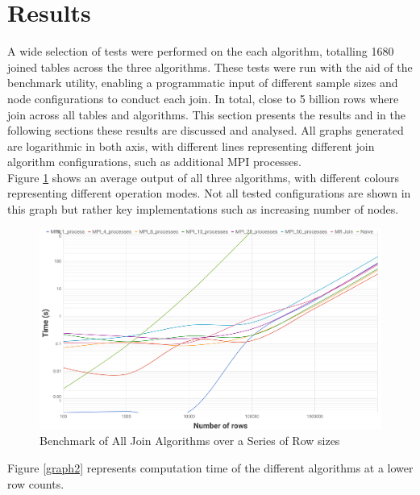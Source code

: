 \documentclass[10.5 pt, conference]{IEEEtran}
\begin{document}
\section{Results}
A wide selection of tests were performed on the each algorithm, totalling 1680 joined tables across the three algorithms. These tests were run with the aid of the benchmark utility, enabling a programmatic input of different sample sizes and node configurations to conduct each join. In total, close to 5 billion rows where join across all tables and algorithms. This section presents the results and in the following sections these results are discussed and analysed. All graphs generated are logarithmic in both axis, with different lines representing different join algorithm configurations, such as additional MPI processes.\\

Figure \ref{graph1} shows an average output of all three algorithms, with different colours representing different operation modes. Not all tested configurations are shown in this graph but rather key implementations such as increasing number of nodes.

\begin{figure}[h!]
\centering
\includegraphics[width=\textwidth]{graph2.png}
\centering
\caption{Benchmark of All Join Algorithms over a Series of Row sizes}
\label{graph1}
\end{figure}

Figure \ref{graph2} represents computation time of the different algorithms at a lower row counts.
\end{document}
